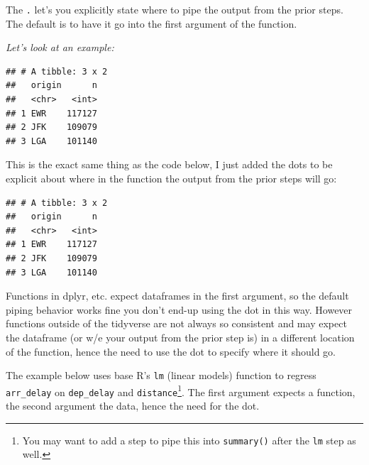 \documentclass[]{book}
\newenvironment{Shaded}{\begin{snugshade}}{\end{snugshade}}
\newcommand{\KeywordTok}[1]{\textcolor[rgb]{0.13,0.29,0.53}{\textbf{#1}}}
\newcommand{\NormalTok}[1]{#1}
\newcommand{\OperatorTok}[1]{\textcolor[rgb]{0.81,0.36,0.00}{\textbf{#1}}}
\newcommand{\StringTok}[1]{\textcolor[rgb]{0.31,0.60,0.02}{#1}}
\let\rmarkdownfootnote\footnote%
\def\footnote{\protect\rmarkdownfootnote}
\theoremstyle{definition}
\theoremstyle{definition}
\theoremstyle{definition}
\theoremstyle{remark}
\begin{document}
The \texttt{.} let's you explicitly state where to pipe the output from
the prior steps. The default is to have it go into the first argument of
the function.

\emph{Let's look at an example:}

\begin{Shaded}
\end{Shaded}

\begin{verbatim}
## # A tibble: 3 x 2
##   origin      n
##   <chr>   <int>
## 1 EWR    117127
## 2 JFK    109079
## 3 LGA    101140
\end{verbatim}

This is the exact same thing as the code below, I just added the dots to
be explicit about where in the function the output from the prior steps
will go:

\begin{Shaded}
\end{Shaded}

\begin{verbatim}
## # A tibble: 3 x 2
##   origin      n
##   <chr>   <int>
## 1 EWR    117127
## 2 JFK    109079
## 3 LGA    101140
\end{verbatim}

Functions in dplyr, etc. expect dataframes in the first argument, so the
default piping behavior works fine you don't end-up using the dot in
this way. However functions outside of the tidyverse are not always so
consistent and may expect the dataframe (or w/e your output from the
prior step is) in a different location of the function, hence the need
to use the dot to specify where it should go.

The example below uses base R's \texttt{lm} (linear models) function to
regress \texttt{arr\_delay} on \texttt{dep\_delay} and
\texttt{distance}\footnote{You may want to add a step to pipe this into
  \texttt{summary()} after the \texttt{lm} step as well.}. The first
argument expects a function, the second argument the data, hence the
need for the dot.
\end{document}
